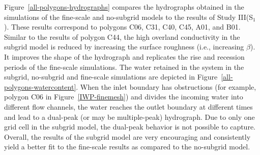 \documentclass[review,11pt]{elsarticle}
\begin{document}
Figure~\ref{all-polygons-hydrographs} compares the hydrographs obtained in the simulations of the fine-scale and no-subgrid models to the results of Study III(S$_1$). These results correspond to polygons C06, C31, C40, C45, A01, and B01. Similar to the results of polygon C44, the high overland conductivity in the subgrid model is reduced by increasing the surface roughness (i.e., increasing $\beta$). It improves the shape of the hydrograph and replicates the rise and recession periods of the fine-scale simulations.
The water retained in the system in the subgrid, no-subgrid and fine-scale simulations are depicted in Figure~\ref{all-polygons-watercontent}. 
When the inlet boundary has obstructions (for example, polygon C06 in Figure~\ref{IWP-finemesh}) and divides the incoming water into different flow channels, the water reaches the outlet boundary at different times and lead to a dual-peak (or may be multiple-peak) hydrograph.  Due to only one grid cell in the subgrid model, the dual-peak behavior is not possible to capture.
Overall, the results of the subgrid model are very encouraging and consistently yield a better fit to the fine-scale results as compared to the no-subgrid model.
%
\end{document}
